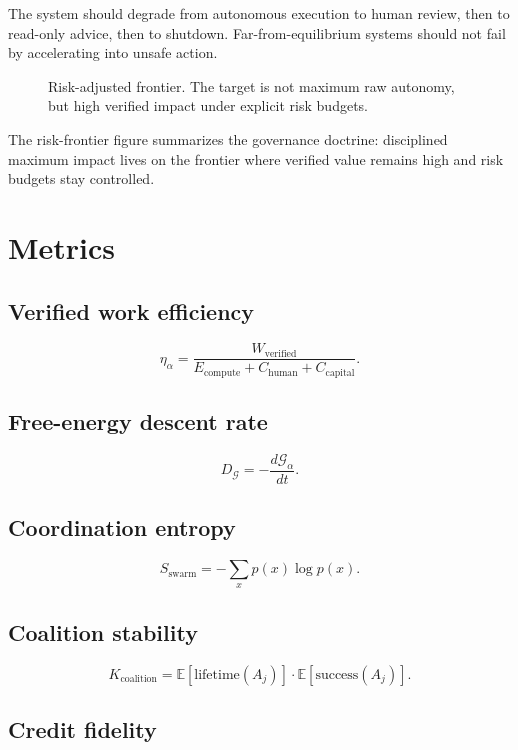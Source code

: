 \documentclass[
  11pt,
]{article}
\begin{document}
The system should degrade from autonomous execution to human review,
then to read-only advice, then to shutdown. Far-from-equilibrium systems
should not fail by accelerating into unsafe action.

\begin{figure}
\centering
\resizebox{0.88\textwidth}{!}{}
\caption{Risk-adjusted frontier. The target is not maximum raw autonomy,
but high verified impact under explicit risk budgets.}
\end{figure}

The risk-frontier figure summarizes the governance doctrine: disciplined maximum impact
lives on the frontier where verified value remains high and risk budgets
stay controlled.

\section{Metrics}\label{metrics-5}

\subsection{Verified work efficiency}\label{verified-work-efficiency}

\[
\eta_{\alpha}=\frac{W_{\text{verified}}}{E_{\text{compute}}+C_{\text{human}}+C_{\text{capital}}}.
\]

\subsection{Free-energy descent rate}\label{free-energy-descent-rate}

\[
D_{\mathcal{G}}=-\frac{d\mathcal{G}_{\alpha}}{dt}.
\]

\subsection{Coordination entropy}\label{coordination-entropy}

\[
S_{\text{swarm}}=-\sum_xp(x)\log p(x).
\]

\subsection{Coalition stability}\label{coalition-stability}

\[
K_{\text{coalition}}=\mathbb{E}[\text{lifetime}(A_j)]\cdot\mathbb{E}[\text{success}(A_j)].
\]

\subsection{Credit fidelity}\label{credit-fidelity}
\end{document}

